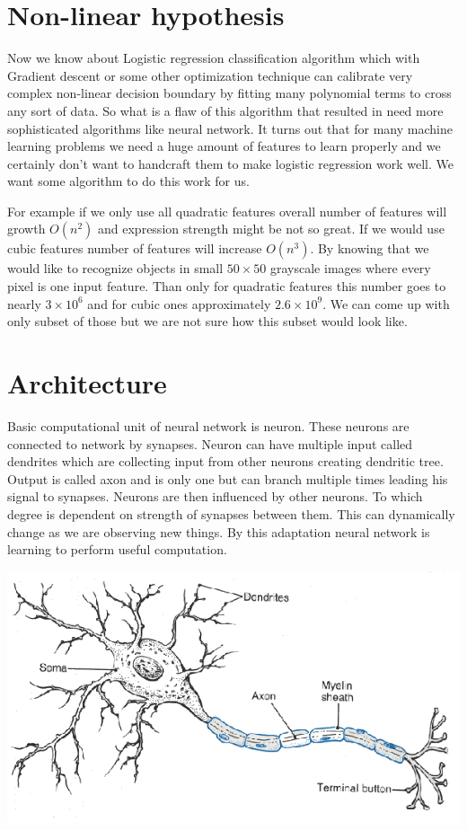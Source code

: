 \section{Non-linear hypothesis}
Now we know about Logistic regression classification algorithm which with Gradient descent or some other optimization technique can calibrate very complex non-linear decision boundary by fitting many polynomial terms to cross any sort of data. So what is a flaw of this algorithm that resulted in need more sophisticated algorithms like neural network. It turns out that for many machine learning problems we need a huge amount of features to learn properly and we certainly don't want to handcraft them to make logistic regression work well. We want some algorithm to do this work for us.

For example if we only use all quadratic features overall number of features will growth \(O(n^2)\) and expression strength might be not so great. If we would use cubic features number of features will increase \(O(n^3)\). By knowing that we would like to recognize objects in small \(50 \times 50\)  grayscale images where every pixel is one input feature. Than only for quadratic features this number goes to nearly \(3\times 10^6\) and for cubic ones approximately \(2.6\times 10^9\). We can come up with only subset of those but we are not sure how this subset would look like. 

\section{Architecture}
Basic computational unit of neural network is neuron. These neurons are connected to network by synapses. Neuron can have multiple input called dendrites which are collecting input from other neurons creating dendritic tree. Output is called axon and is only one but can branch multiple times leading his signal to synapses. Neurons are then influenced by other neurons. To which degree is dependent on strength of synapses between them. This can dynamically change as we are observing new things. By this adaptation neural network is learning to perform useful computation. 

\begin{center}
\includegraphics[scale=0.3]{./pictures/2.png}
\end{center}

